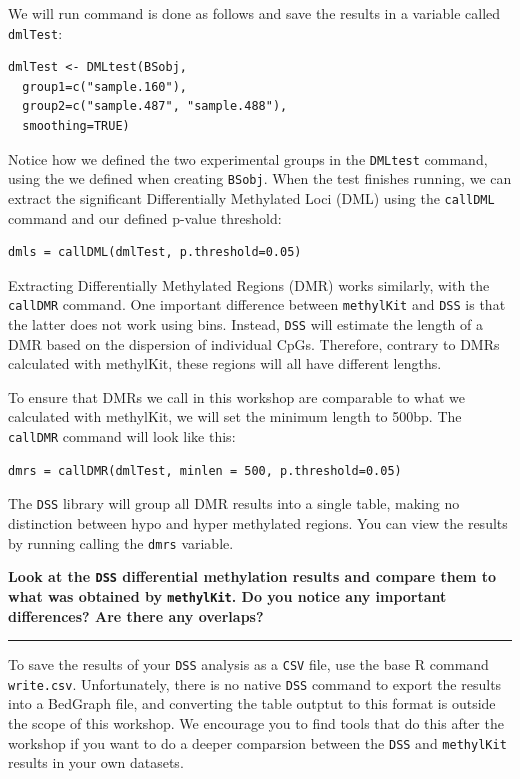 \documentclass[
]{book}
\begin{document}
We will run command is done as follows and save the results in a variable called \texttt{dmlTest}:

\begin{verbatim}
dmlTest <- DMLtest(BSobj, 
  group1=c("sample.160"), 
  group2=c("sample.487", "sample.488"), 
  smoothing=TRUE)
\end{verbatim}

Notice how we defined the two experimental groups in the \texttt{DMLtest} command, using the we defined when creating \texttt{BSobj}. When the test finishes running, we can extract the significant Differentially Methylated Loci (DML) using the \texttt{callDML} command and our defined p-value threshold:

\begin{verbatim}
dmls = callDML(dmlTest, p.threshold=0.05)
\end{verbatim}

Extracting Differentially Methylated Regions (DMR) works similarly, with the \texttt{callDMR} command. One important difference between \texttt{methylKit} and \texttt{DSS} is that the latter does not work using bins. Instead, \texttt{DSS} will estimate the length of a DMR based on the dispersion of individual CpGs. Therefore, contrary to DMRs calculated with methylKit, these regions will all have different lengths.

To ensure that DMRs we call in this workshop are comparable to what we calculated with methylKit, we will set the minimum length to 500bp. The \texttt{callDMR} command will look like this:

\begin{verbatim}
dmrs = callDMR(dmlTest, minlen = 500, p.threshold=0.05)
\end{verbatim}

The \texttt{DSS} library will group all DMR results into a single table, making no distinction between hypo and hyper methylated regions. You can view the results by running calling the \texttt{dmrs} variable.

\textbf{Look at the \texttt{DSS} differential methylation results and compare them to what was obtained by \texttt{methylKit}. Do you notice any important differences? Are there any overlaps?}

\begin{center}\rule{0.5\linewidth}{0.5pt}\end{center}

To save the results of your \texttt{DSS} analysis as a \texttt{CSV} file, use the base R command \texttt{write.csv}. Unfortunately, there is no native \texttt{DSS} command to export the results into a BedGraph file, and converting the table outptut to this format is outside the scope of this workshop. We encourage you to find tools that do this after the workshop if you want to do a deeper comparsion between the \texttt{DSS} and \texttt{methylKit} results in your own datasets.
\end{document}
